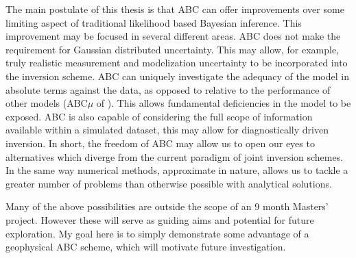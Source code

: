 The main postulate of this thesis is that ABC can offer improvements over some limiting aspect of traditional likelihood based Bayesian inference. This improvement may be focused in several different areas. ABC does not make the requirement for Gaussian distributed uncertainty. This may allow, for example, truly realistic measurement and modelization uncertainty to be incorporated into the inversion scheme. ABC can uniquely investigate the adequacy of the model in absolute terms against the data, as opposed to relative to the performance of other models (ABC$\mu$ of \citet{Ratmann2009}). This allows fundamental deficiencies in the model to be exposed. ABC is also capable of considering the full scope of information available within a simulated dataset, this may allow for diagnostically driven inversion. In short, the freedom of ABC may allow us to open our eyes to alternatives which diverge from the current paradigm of joint inversion schemes. In the same way numerical methods, approximate in nature, allows us to tackle a greater number of problems than otherwise possible with analytical solutions. \par

Many of the above possibilities are outside the scope of an 9 month Masters' project. However these will serve as guiding aims and potential for future exploration. My goal here is to simply demonstrate some advantage of a geophysical ABC scheme, which will motivate future investigation.